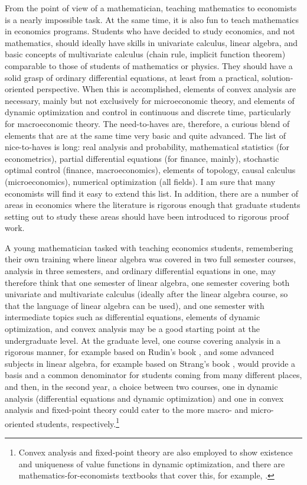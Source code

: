 \documentclass[10pt]{article}
\begin{document}
From the point of view of a mathematician, teaching mathematics to economists is a nearly impossible task. At the same time, it is also fun to teach mathematics in economics programs. Students who have decided to study economics, and not mathematics, should ideally have skills in univariate calculus, linear algebra, and basic concepts of multivariate calculus (chain rule, implicit function theorem) comparable to those of students of mathematics or physics. They should have a solid grasp of ordinary differential equations, at least from a practical, solution-oriented perspective. When this is accomplished, elements of convex analysis are necessary, mainly but not exclusively for microeconomic theory, and elements of dynamic optimization and control in continuous and discrete time, particularly for macroeconomic theory. The need-to-haves are, therefore, a curious blend of elements that are at the same time very basic and quite advanced. The list of nice-to-haves is long: real analysis and probability, mathematical statistics (for econometrics), partial differential equations (for finance, mainly), stochastic optimal control (finance, macroeconomics), elements of topology, causal calculus (microeconomics), numerical optimization (all fields). I am sure that many economists will find it easy to extend this list. In addition, there are a number of areas in economics where the literature is rigorous enough that graduate students setting out to study these areas should have been introduced to rigorous proof work.

A young mathematician tasked with teaching economics students, remembering their own training where linear algebra was covered in two full semester courses, analysis in three semesters, and ordinary differential equations in one, may therefore think that one semester of linear algebra, one semester covering both univariate and multivariate calculus (ideally after the linear algebra course, so that the language of linear algebra can be used), and one semester with intermediate topics such as differential equations, elements of dynamic optimization, and convex analysis may be a good starting point at the undergraduate level. At the graduate level, one course covering analysis in a rigorous manner, for example based on Rudin's book \citep{Rudin1976}, and some advanced subjects in linear algebra, for example based on Strang's book \citep{Strang2023}, would provide a basis and a common denominator for students coming from many different places, and then, in the second year, a choice between two courses, one in dynamic analysis (differential equations and dynamic optimization) and one in convex analysis and fixed-point theory could cater to the more macro- and micro-oriented students, respectively.\footnote{Convex analysis and fixed-point theory are also employed to show existence and uniqueness of value functions in dynamic optimization, and there are mathematics-for-economists textbooks that cover this, for example, \cite{Corbae2009}.}
\end{document}

